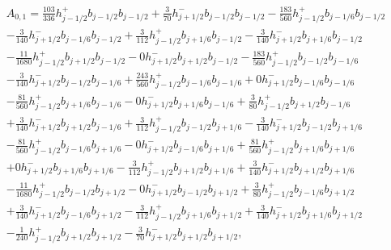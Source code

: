 \documentclass[12pt]{article}
\begin{document}
\begin{multline*} A_{0,1} = \frac{103}{336} h_{j-1/2}^+ b_{j-1/2} b_{j-1/2}+\frac{3}{70} h_{j+1/2}^- b_{j-1/2} b_{j-1/2}-\frac{183}{560} h_{j-1/2}^+ b_{j-1/6} b_{j-1/2}\\-\frac{3}{140} h_{j+1/2}^- b_{j-1/6} b_{j-1/2}+\frac{3}{112} h_{j-1/2}^+ b_{j+1/6} b_{j-1/2}-\frac{3}{140} h_{j+1/2}^- b_{j+1/6} b_{j-1/2}\\-\frac{11}{1680} h_{j-1/2}^+ b_{j+1/2} b_{j-1/2}-0 h_{j+1/2}^- b_{j+1/2} b_{j-1/2}-\frac{183}{560} h_{j-1/2}^+ b_{j-1/2} b_{j-1/6}\\-\frac{3}{140} h_{j+1/2}^- b_{j-1/2} b_{j-1/6}+\frac{243}{560} h_{j-1/2}^+ b_{j-1/6} b_{j-1/6}+0 h_{j+1/2}^- b_{j-1/6} b_{j-1/6}\\-\frac{81}{560} h_{j-1/2}^+ b_{j+1/6} b_{j-1/6}-0 h_{j+1/2}^- b_{j+1/6} b_{j-1/6}+\frac{3}{80} h_{j-1/2}^+ b_{j+1/2} b_{j-1/6}\\+\frac{3}{140} h_{j+1/2}^- b_{j+1/2} b_{j-1/6}+\frac{3}{112} h_{j-1/2}^+ b_{j-1/2} b_{j+1/6}-\frac{3}{140} h_{j+1/2}^- b_{j-1/2} b_{j+1/6}\\-\frac{81}{560} h_{j-1/2}^+ b_{j-1/6} b_{j+1/6}-0 h_{j+1/2}^- b_{j-1/6} b_{j+1/6}+\frac{81}{560} h_{j-1/2}^+ b_{j+1/6} b_{j+1/6}\\+0 h_{j+1/2}^- b_{j+1/6} b_{j+1/6}-\frac{3}{112} h_{j-1/2}^+ b_{j+1/2} b_{j+1/6}+\frac{3}{140} h_{j+1/2}^- b_{j+1/2} b_{j+1/6}\\-\frac{11}{1680} h_{j-1/2}^+ b_{j-1/2} b_{j+1/2}-0 h_{j+1/2}^- b_{j-1/2} b_{j+1/2}+\frac{3}{80} h_{j-1/2}^+ b_{j-1/6} b_{j+1/2}\\+\frac{3}{140} h_{j+1/2}^- b_{j-1/6} b_{j+1/2}-\frac{3}{112} h_{j-1/2}^+ b_{j+1/6} b_{j+1/2}+\frac{3}{140} h_{j+1/2}^- b_{j+1/6} b_{j+1/2}\\-\frac{1}{240} h_{j-1/2}^+ b_{j+1/2} b_{j+1/2}-\frac{3}{70} h_{j+1/2}^- b_{j+1/2} b_{j+1/2}, \end{multline*}
\end{document}
